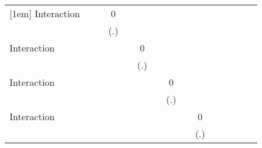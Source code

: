 \begin{table}[htbp]
\begin{tabular}{l*{14}{c}}
[1em]
Interaction &                     &                     &           0         &                     &                     &                     &                     &                     &                     &                     &                     &                     &                     &                     \\
            &                     &                     &         (.)         &                     &                     &                     &                     &                     &                     &                     &                     &                     &                     &                     \\
[1em]
Interaction &                     &                     &                     &                     &           0         &                     &                     &                     &                     &                     &                     &                     &                     &                     \\
            &                     &                     &                     &                     &         (.)         &                     &                     &                     &                     &                     &                     &                     &                     &                     \\
[1em]
Interaction &                     &                     &                     &                     &                     &                     &           0         &                     &                     &                     &                     &                     &                     &                     \\
            &                     &                     &                     &                     &                     &                     &         (.)         &                     &                     &                     &                     &                     &                     &                     \\
[1em]
Interaction &                     &                     &                     &                     &                     &                     &                     &                     &           0         &                     &                     &                     &                     &                     \\
            &                     &                     &                     &                     &                     &                     &                     &                     &         (.)         &                     &                     &                     &                     &                     \\

\end{tabular}
\end{table}
